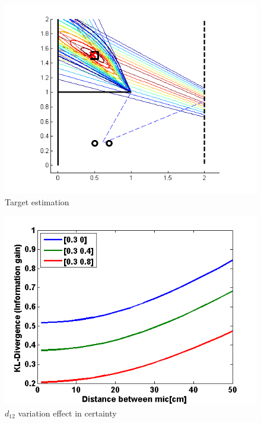 \documentclass[letterpaper, 10 pt, conference]{ieeeconf}  %
\begin{document}
\begin{figure}[thpb]
  \centering
  \includegraphics[width=\columnwidth]{Figures/estimation.png} %
  \caption{Target estimation}
  \label{fig:localization}
\end{figure}

\begin{figure}[thpb]
    \centering
    \includegraphics[width=0.7\columnwidth]{Figures/sensor_param.png} %
    \caption{$d_{12}$ variation effect in certainty}
    \label{fig:mic_param}
\end{figure}
\end{document}

